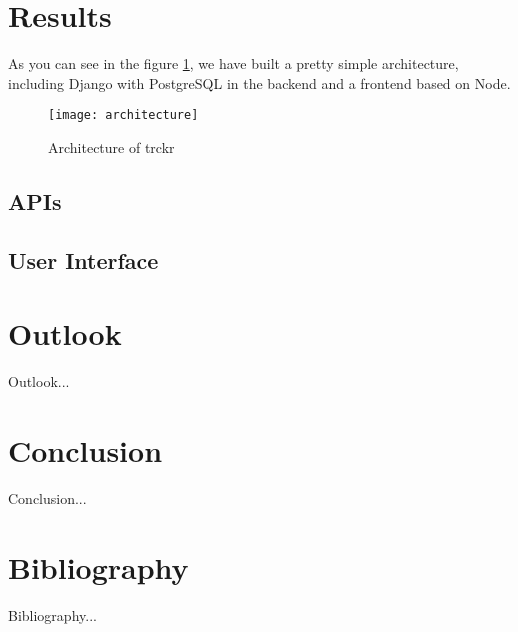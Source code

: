 \documentclass[a4paper, 12pt, headsepline]{scrartcl}
\begin{document}
\section{Results}
As you can see in the figure \ref{fig:architecture}, we have built a pretty simple architecture,
including Django with PostgreSQL in the backend and a frontend based on Node.
 
\begin{figure}[h]
    \texttt{[image: architecture]}
    \caption{Architecture of trckr}
    \label{fig:architecture}
\end{figure}

\subsection{APIs}


\subsection{User Interface}

\section{Outlook}
Outlook...

\section{Conclusion}
Conclusion...

\section{Bibliography}
Bibliography...

\listoffigures
\end{document}
